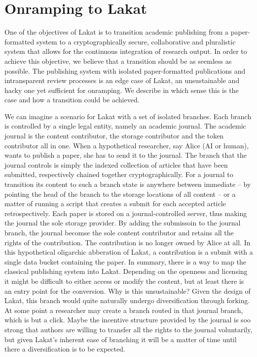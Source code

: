 
\section{Onramping to Lakat}

One of the objectives of Lakat is to transition academic publishing from a paper-formatted system to a cryptographically secure, collaborative and pluralistic system that allows for the continuous integration of research output. In order to achieve this objective, we believe that a transition should be as seemless as possible. The publishing system with isolated paper-formatted publications and intransparent review processes is an edge case of Lakat, an unsustainable and hacky one yet sufficient for onramping. We describe in which sense this is the case and how a transition could be achieved.

We can imagine a scenario for Lakat with a set of isolated branches. Each branch is controlled by a single legal entity, namely an academic journal. The academic journal is the content contributor, the storage contributor and the token contributor all in one. When a hypothetical researcher, say Alice (AI or human), wants to publish a paper, she has to send it to the journal. The branch that the journal  controls is simply the indexed collection of articles that have been submitted, respectively chained together cryptographically. For a journal to transition its content to such a branch state is anywhere between immediate -- by pointing the head of the branch to the storage locations of all content -- or a matter of running a script that creates a submit for each accepted article retrospectively.  Each paper is stored on a journal-controlled server, thus making the journal the sole storage provider. By adding the submissoin to the journal branch, the journal becomse the sole content contributor and retains all the rights of the contribution. The contribution is no longer owned by Alice at all. In this hypothetical oligarchic abberation of Lakat, a contribution is a submit with a single data bucket containing the paper. In summary, there is a way to map the classical publishing system into Lakat. Depending on the openness and licensing it might be difficult to either access or modify the content, but at least there is an entry point for the conversion.
Why is this unsustainable?  Given the design of Lakat, this branch would quite naturally undergo diversification through forking. At some point a researcher may create a branch routed in that journal branch, which is but a click. Maybe the incentive structure provided by the journal is soo strong that authors are willing to transfer all the rights to the journal voluntarily, but given Lakat's inherent ease of branching it will be a matter of time until there a diversification is to be expected.
